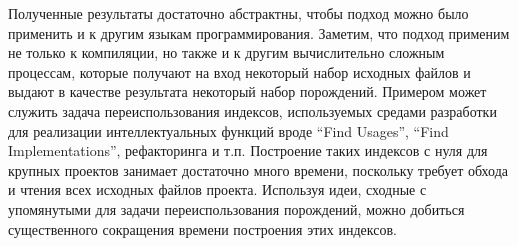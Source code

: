 Полученные результаты достаточно абстрактны, чтобы подход можно было применить и к другим языкам программирования. Заметим, что подход применим не только к компиляции, но также и к другим вычислительно сложным процессам, которые получают на вход некоторый набор исходных файлов и выдают в качестве результата некоторый набор порождений. Примером может служить задача переиспользования индексов, используемых средами разработки для реализации интеллектуальных функций вроде ``Find Usages'', ``Find Implementations'', рефакторинга и т.п. Построение таких индексов с нуля для крупных проектов занимает достаточно много времени, поскольку требует обхода и чтения всех исходных файлов проекта. Используя идеи, сходные с упомянутыми для задачи переиспользования порождений, можно добиться существенного сокращения времени построения этих индексов.